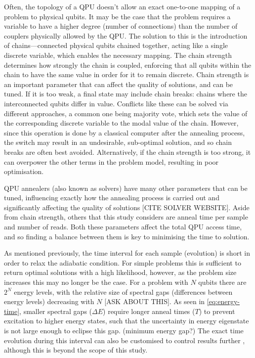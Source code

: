 \documentclass[12pt]{article}
\theoremstyle{definition}
\begin{document}
Often, the topology of a QPU doesn't allow an exact one-to-one mapping of a problem to physical qubits. It may be the case that the problem requires a variable to have a higher degree (number of connections) than the number of couplers physically allowed by the QPU. The solution to this is the introduction of chains---connected physical qubits chained together, acting like a single discrete variable, which enables the necessary mapping. The chain strength determines how strongly the chain is coupled, enforcing that all qubits within the chain to have the same value in order for it to remain discrete. Chain strength is an important parameter that can affect the quality of solutions, and can be tuned. If it is too weak, a final state may include chain breaks: chains where the interconnected qubits differ in value. Conflicts like these can be solved via different approaches, a common one being majority vote, which sets the value of the corresponding discrete variable to the modal value of the chain. However, since this operation is done by a classical computer after the annealing process, the switch may result in an undesirable, sub-optimal solution, and so chain breaks are often best avoided. Alternatively, if the chain strength is too strong, it can overpower the other terms in the problem model, resulting in poor optimisation.

QPU annealers (also known as solvers) have many other parameters that can be tuned, influencing exactly how the annealing process is carried out and significantly affecting the quality of solutions [CITE SOLVER WEBSITE]. Aside from chain strength, others that this study considers are anneal time per sample and number of reads. Both these parameters affect the total QPU access time, and so finding a balance between them is key to minimising the time to solution.

As mentioned previously, the time interval for each sample (evolution) is short in order to relax the adiabatic condition. For simple problems this is sufficient to return optimal solutions with a high likelihood, however, as the problem size increases this may no longer be the case. For a problem with $N$ qubits there are $2^N$ energy levels, with the relative size of spectral gaps (differences between energy levels) decreasing with $N$ [ASK ABOUT THIS]. As seen in \cref{eq:energy-time}, smaller spectral gaps ($\Delta E$) require longer anneal times ($T$) to prevent excitation to higher energy states, such that the uncertainty in energy eigenstate is not large enough to eclipse this gap. (minimum energy gap?) The exact time evolution during this interval can also be customised to control results further \cite{khezri_customized_2022}, although this is beyond the scope of this study.
\end{document}
